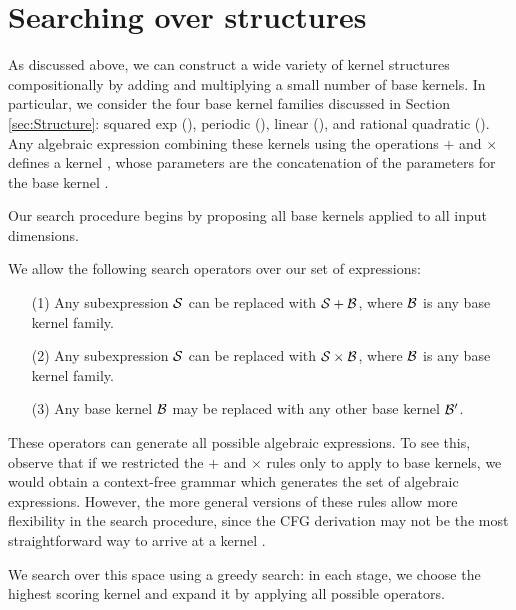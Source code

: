 \documentclass[twoside]{article}
\begin{document}
\section{Searching over structures}
\label{sec:Search}

As discussed above, we can construct a wide variety of kernel structures compositionally by adding and multiplying a small number of base kernels.
In particular, we consider the four base kernel families discussed in Section \ref{sec:Structure}: squared exp (\kSE), periodic (\kPer), linear (\kLin), and rational quadratic (\kRQ).
Any algebraic expression combining these kernels using the operations $+$ and $\times$ defines a kernel , whose parameters are the concatenation of the parameters for the base kernel . 

Our search procedure begins by proposing all base kernels applied to all input dimensions. 

We allow the following search operators over our set of expressions:
\begin{itemize}
\item[(1)] Any subexpression ${\cal S}$ can be replaced with ${\cal S} + {\cal B}$, where ${\cal B}$ is any base kernel family.
\item[(2)] Any subexpression ${\cal S}$ can be replaced with ${\cal S} \times {\cal B}$, where ${\cal B}$ is any base kernel family.
\item[(3)] Any base kernel ${\cal B}$ may be replaced with any other base kernel ${\cal B}^\prime$.
\end{itemize}

These operators can generate all possible algebraic expressions.
To see this, observe that if we restricted the $+$ and $\times$ rules only to apply to base kernels, we would obtain a context-free grammar which generates the set of algebraic expressions.
However, the more general versions of these rules allow more flexibility in the search procedure, since the CFG derivation may not be the most straightforward way to arrive at a kernel .

We search over this space using a greedy search: in each stage, we choose the highest scoring kernel and expand it by applying all possible operators.
\end{document}
